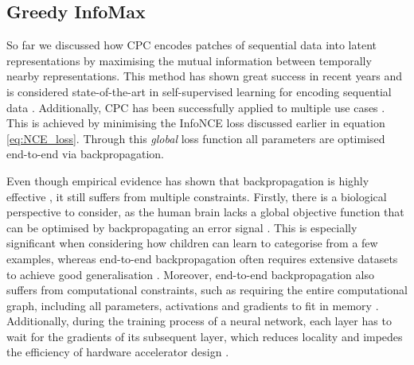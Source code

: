 \subsection{Greedy InfoMax}
	So far we discussed how CPC encodes patches of sequential data into latent representations by maximising the mutual information between temporally nearby representations. This method has shown great success in recent years and is considered state-of-the-art in self-supervised learning for encoding sequential data \citep{stackeEvaluationContrastivePredictive2020}. Additionally, CPC has been successfully applied to multiple use cases \citep{stackeEvaluationContrastivePredictive2020, dehaanContrastivePredictiveCoding2021, luSemiSupervisedHistologyClassification2019, bhatiSegmentalContrastivePredictive2021, deldariTimeSeriesChange2021, henaffDataEfficientImageRecognition2020}. This is achieved by minimising the InfoNCE loss discussed earlier in equation \ref{eq:NCE_loss}. Through this \textit{global} loss function all parameters are optimised end-to-end via backpropagation. 
	
	Even though empirical evidence has shown that backpropagation is highly effective \citep{NIPS2012_c399862d, ioffeBatchNormalizationAccelerating2015a}, it still suffers from multiple constraints. Firstly, there is a biological perspective to consider, as the human brain lacks a global objective function that can be optimised by backpropagating an error signal \citep{marblestoneIntegrationDeepLearning2016}. This is especially significant when considering how children can learn to categorise from a few examples, whereas end-to-end backpropagation often requires extensive datasets to achieve good generalisation \citep{lowePuttingEndEndtoEnd2020a}. Moreover, end-to-end backpropagation also suffers from computational constraints, such as requiring the entire computational graph, including all parameters, activations and gradients to fit in memory \citep{lowePuttingEndEndtoEnd2020a}. Additionally, during the training process of a neural network, each layer has to wait for the gradients of its subsequent layer, which reduces locality and impedes the efficiency of hardware accelerator design \citep{lowePuttingEndEndtoEnd2020a}.
		
		
	
